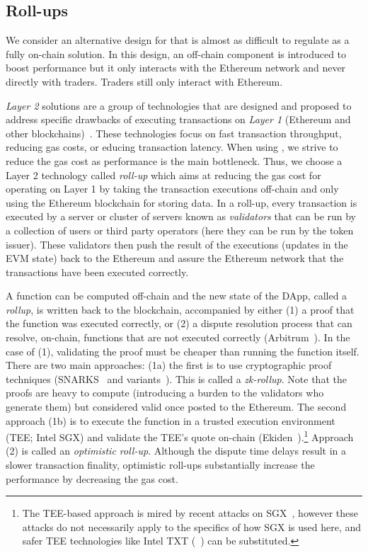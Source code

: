 \subsection{Roll-ups}

We consider an alternative design for \cm that is almost as difficult to regulate as a fully on-chain solution. In this design, an off-chain component is introduced to boost performance but it only interacts with the Ethereum network and never directly with traders. Traders still only interact with Ethereum.



\textit{Layer 2} solutions are a group of technologies that are designed and proposed to address specific drawbacks of executing transactions on \textit{Layer 1} (\ie Ethereum and other blockchains)~\cite{gudgeon2020sok}. These technologies focus on fast transaction throughput, reducing gas costs, or educing transaction latency. When using \cm, we strive to reduce the gas cost as performance is the main bottleneck. Thus, we choose a Layer 2 technology called \textit{roll-up} which aims at reducing the gas cost for operating on Layer 1 by taking the transaction executions off-chain and only using the Ethereum blockchain for storing data. In a roll-up, every transaction is executed by a server or cluster of servers known as \textit{validators} that can be run by a collection of users or third party operators (here they can be run by the token issuer). These validators then push the result of the executions (\ie updates in the EVM state) back to the Ethereum and assure the Ethereum network that the transactions have been executed correctly.


A function can be computed off-chain and the new state of the DApp, called a \textit{rollup}, is written back to the blockchain, accompanied by either (1) a proof that the function was executed correctly, or (2) a dispute resolution process that can resolve, on-chain, functions that are not executed correctly (\eg Arbitrum~\cite{kalodner2018arbitrum}). In the case of (1), validating the proof must be cheaper than running the function itself. There are two main approaches: (1a) the first is to use cryptographic proof techniques (\eg SNARKS~\cite{BCGTV13,GGPR13} and variants~\cite{BBHR19}). This is called a \textit{zk-rollup}. Note that the proofs are heavy to compute (introducing a burden to the validators who generate them) but considered valid once posted to the Ethereum. The second approach (1b) is to execute the function in a trusted execution environment (TEE; \eg Intel SGX) and validate the TEE's quote on-chain (\eg Ekiden~\cite{cheng2019ekiden}).\footnote{The TEE-based approach is mired by recent attacks on SGX~\cite{SGX1,SGX2,SGX3,SGX4}, however these attacks do not necessarily apply to the specifics of how SGX is used here, and safer TEE technologies like Intel TXT (\cf~\cite{ZBC+19}) can be substituted.} Approach (2) is called an \textit{optimistic roll-up}. Although the dispute time delays result in a slower transaction finality, optimistic roll-ups substantially increase the performance by decreasing the gas cost.

